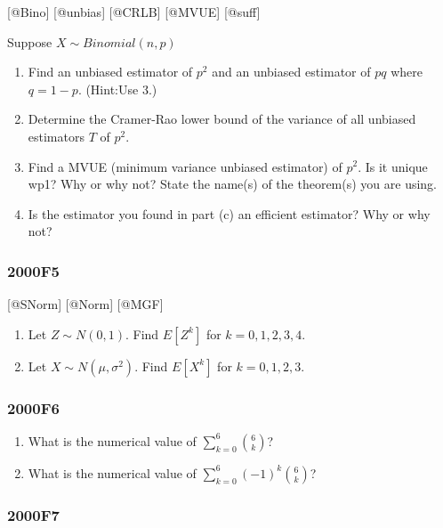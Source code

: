 \documentclass[6pt,twocolumn,Portrait]{article}
\begin{document}
{[}@Bino{]} {[}@unbias{]} {[}@CRLB{]} {[}@MVUE{]} {[}@suff{]}

Suppose \(X\sim Binomial(n,p)\)

\begin{enumerate}
\def\labelenumi{\Alph{enumi})}
\item
  Find an unbiased estimator of \(p^2\) and an unbiased estimator of
  \(pq\) where \(q=1-p\). (Hint:Use 3.)
\item
  Determine the Cramer-Rao lower bound of the variance of all unbiased
  estimators \(T\) of \(p^2\).
\item
  Find a MVUE (minimum variance unbiased estimator) of \(p^2\). Is it
  unique wp1? Why or why not? State the name(s) of the theorem(s) you
  are using.
\item
  Is the estimator you found in part (c) an efficient estimator? Why or
  why not?
\end{enumerate}

\hypertarget{f5}{%
\subsubsection{2000F5}\label{f5}}

{[}@SNorm{]} {[}@Norm{]} {[}@MGF{]}

\begin{enumerate}
\def\labelenumi{\Alph{enumi})}
\item
  Let \(Z\sim N(0, 1)\). Find \(E[Z^k]\) for \(k=0,1,2,3,4\).
\item
  Let \(X\sim N(\mu,\sigma^2)\). Find \(E[X^k]\) for \(k=0,1,2,3\).
\end{enumerate}

\hypertarget{f6}{%
\subsubsection{2000F6}\label{f6}}

\begin{enumerate}
\def\labelenumi{\Alph{enumi})}
\item
  What is the numerical value of \(\sum_{k=0}^6\binom{6}{k}\)?
\item
  What is the numerical value of \(\sum_{k=0}^6(-1)^k\binom{6}{k}\)?
\end{enumerate}

\hypertarget{f7}{%
\subsubsection{2000F7}\label{f7}}
\end{document}
